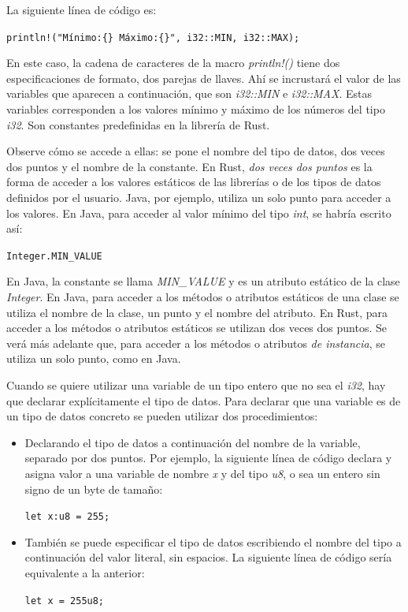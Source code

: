 La siguiente línea de código es:

{\centering \texttt{println!("Mínimo:\{\} Máximo:\{\}", i32::MIN, i32::MAX);} \par}

En este caso, la cadena de caracteres de la macro \textit{println!()} tiene dos especificaciones de formato, dos parejas de llaves. Ahí se incrustará el valor de las variables que aparecen a continuación, que son \textit{i32::MIN} e \textit{i32::MAX}. Estas variables corresponden a los valores mínimo y máximo de los números del tipo \textit{i32}. Son constantes predefinidas en la librería de Rust. 

Observe cómo se accede a ellas: se pone el nombre del tipo de datos, dos veces dos puntos y el nombre de la constante. En Rust, \textit{dos veces dos puntos} es la forma de acceder a los valores estáticos de las librerías o de los tipos de datos definidos por el usuario. Java, por ejemplo, utiliza un solo punto para acceder a los valores. En Java, para acceder al valor mínimo del tipo \textit{int}, se habría escrito así:

{\centering \texttt{Integer.MIN\_VALUE} \par}

En Java, la constante se llama \textit{MIN\_VALUE} y es un atributo estático de la clase \textit{Integer}. En Java, para acceder a los métodos o atributos estáticos de una clase se utiliza el nombre de la clase, un punto y el nombre del atributo. En Rust, para acceder a los métodos o atributos estáticos se utilizan dos veces dos puntos. Se verá más adelante que, para acceder a los métodos o atributos \textit{de instancia}, se utiliza un solo punto, como en Java.

Cuando se quiere utilizar una variable de un tipo entero que no sea el \textit{i32}, hay que declarar explícitamente el tipo de datos. Para declarar que una variable es de un tipo de datos concreto se pueden utilizar dos procedimientos:

\begin{itemize}
   \item Declarando el tipo de datos a continuación del nombre de la variable, separado por dos puntos. Por ejemplo, la siguiente línea de código declara y asigna valor a una variable de nombre \textit{x} y del tipo \textit{u8}, o sea un entero sin signo de un byte de tamaño:
   
   {\centering \texttt{let x:u8 = 255;} \par}
   
   \item También se puede especificar el tipo de datos escribiendo el nombre del tipo  a continuación del valor literal, sin espacios. La siguiente línea de código sería equivalente a la anterior:
   
   {\centering \texttt{let x = 255u8;} \par}   
\end{itemize}


